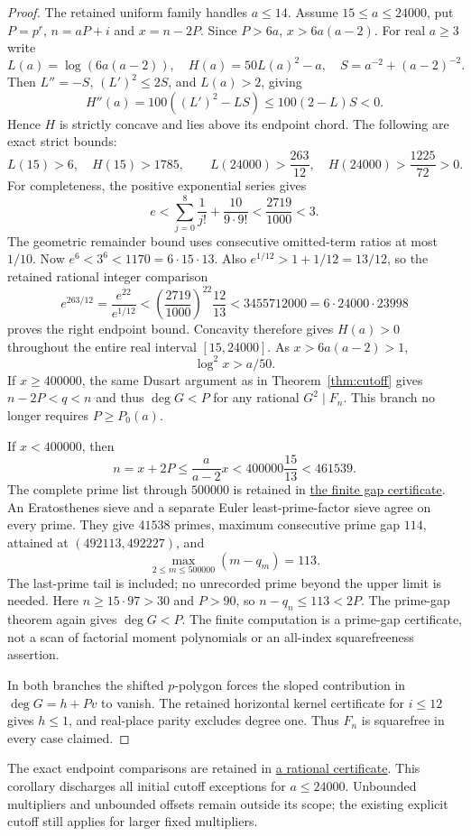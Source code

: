\documentclass[11pt]{article}
\begin{document}
\begin{proof}
The retained uniform family handles $a\le14$. Assume $15\le a\le24000$,
put $P=p^r$, $n=aP+i$ and $x=n-2P$. Since $P>6a$,
$x>6a(a-2)$. For real $a\ge3$ write
\[
 L(a)=\log(6a(a-2)),\quad H(a)=50L(a)^2-a,\quad
 S=a^{-2}+(a-2)^{-2}.
\]
Then $L''=-S$, $(L')^2\le2S$, and $L(a)>2$, giving
\[
 H''(a)=100((L')^2-LS)\le100(2-L)S<0.
\]
Hence $H$ is strictly concave and lies above its endpoint chord.
The following are exact strict bounds:
\[
 L(15)>6,\quad H(15)>1785,\qquad
 L(24000)>\frac{263}{12},\quad H(24000)>\frac{1225}{72}>0.
\]
For completeness, the positive exponential series gives
\[
 e<\sum_{j=0}^{8}\frac1{j!}+\frac{10}{9\cdot9!}
   <\frac{2719}{1000}<3.
\]
The geometric remainder bound uses consecutive omitted-term ratios
at most $1/10$. Now $e^6<3^6<1170=6\cdot15\cdot13$.
Also $e^{1/12}>1+1/12=13/12$, so the retained rational integer comparison
\[
 e^{263/12}=\frac{e^{22}}{e^{1/12}}
 <\left(\frac{2719}{1000}\right)^{22}\frac{12}{13}
 <3455712000=6\cdot24000\cdot23998
\]
proves the right endpoint bound. Concavity therefore gives $H(a)>0$
throughout the entire real interval $[15,24000]$. As $x>6a(a-2)>1$,
\[
 \log^2x>a/50.
\]
If $x\ge400000$, the same Dusart argument as in Theorem~\ref{thm:cutoff}
gives $n-2P<q<n$ and thus $\deg G<P$ for any rational $G^2\mid F_n$.
This branch no longer requires $P\ge P_0(a)$.

If $x<400000$, then
\[
 n=x+2P\le\frac{a}{a-2}x
 <400000\frac{15}{13}<461539.
\]
The complete prime list through $500000$ is retained in
\href{initial_prime_gaps_500000.json}{the finite gap certificate}.
An Eratosthenes sieve and a separate Euler least-prime-factor sieve
agree on every prime. They give $41538$ primes, maximum consecutive
prime gap $114$, attained at $(492113,492227)$, and
\[
 \max_{2\le m\le500000}(m-q_m)=113.
\]
The last-prime tail is included; no unrecorded prime beyond the upper
limit is needed. Here $n\ge15\cdot97>30$ and $P>90$, so
$n-q_n\le113<2P$. The prime-gap theorem again gives $\deg G<P$.
The finite computation is a prime-gap certificate, not a scan of
factorial moment polynomials or an all-index squarefreeness assertion.

In both branches the shifted $p$-polygon forces the sloped contribution
in $\deg G=h+Pv$ to vanish. The retained horizontal kernel certificate
for $i\le12$ gives $h\le1$, and real-place parity excludes degree one.
Thus $F_n$ is squarefree in every case claimed.
\end{proof}
The exact endpoint comparisons are retained in
\href{multiplier_endpoint_certificate.json}{a rational certificate}.
This corollary discharges all initial cutoff exceptions for $a\le24000$.
Unbounded multipliers and unbounded offsets remain outside its scope;
the existing explicit cutoff still applies for larger fixed multipliers.
\end{document}
